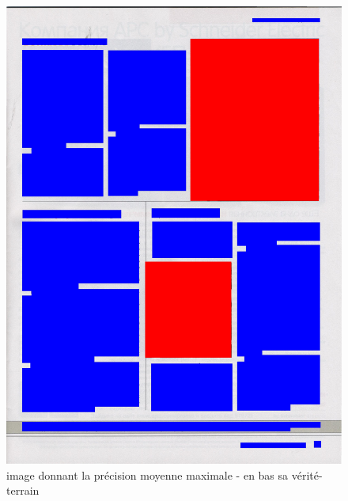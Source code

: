 \documentclass{book}
\begin{document}
\begin{figure}[H]
\begin{center}
\includegraphics[scale=0.25]{images/20_m.jpg}
\end{center}
\caption{image donnant la précision moyenne maximale - en bas sa vérité-terrain}
\label{meilleur_precision}
\end{figure}
\end{document}
